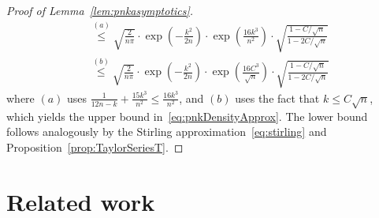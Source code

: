 \documentclass[twoside]{article}
\begin{document}
\begin{proof}[Proof of Lemma~\ref{lem:pnkasymptotics}]
\begin{align}
    &\stackrel{(a)}{\le} \sqrt{\frac{2}{n\pi}} \cdot \exp\left(-\frac{k^2}{2n}\right)\cdot \exp\left(\frac{16k^3}{n^2}\right)\cdot\sqrt{\frac{1-C/\sqrt{n}}{1-2C/\sqrt{n}}} \nonumber\\
    &\stackrel{(b)}{\le}  \sqrt{\frac{2}{n\pi}} \cdot \exp\left(-\frac{k^2}{2n}\right)\cdot \exp\left(\frac{16C^3}{\sqrt{n}}\right)\cdot\sqrt{\frac{1-C/\sqrt{n}}{1-2C/\sqrt{n}}} \label{eq:pnkAsympUB}
\end{align}
where $(a)$ uses $\frac{1}{12n-k}+\frac{15k^3}{n^2} \le \frac{16k^3}{n^2}$, and $(b)$ uses the fact that $k \le C\sqrt{n}$, which yields the upper bound in~\eqref{eq:pnkDensityApprox}. The lower bound follows analogously by the Stirling approximation~\eqref{eq:stirling} and Proposition~\ref{prop:TaylorSeriesT}.
\end{proof}



\section{Related work}

\end{document}

